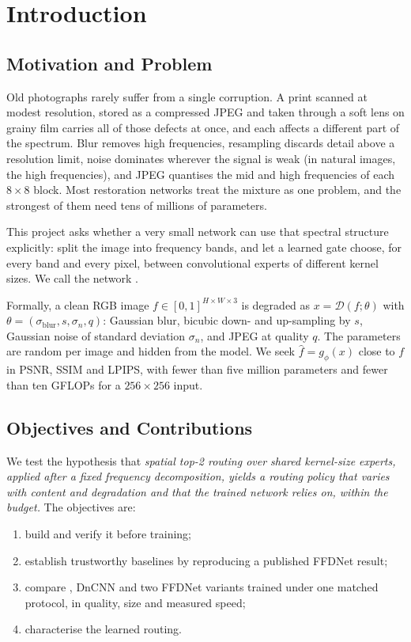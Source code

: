 \chapter{Introduction}\label{ch:intro}

\section{Motivation and Problem}\label{sec:motivation}

Old photographs rarely suffer from a single corruption. A print scanned at
modest resolution, stored as a compressed JPEG and taken through a soft lens
on grainy film carries all of those defects at once, and each affects a
different part of the spectrum. Blur removes high frequencies, resampling
discards detail above a resolution limit, noise dominates wherever the signal
is weak (in natural images, the high frequencies), and JPEG quantises the mid
and high frequencies of each $8\times8$ block. Most restoration networks
treat the mixture as one problem, and the strongest of them
need tens of millions of parameters.

This project asks whether a very small network can use that spectral
structure explicitly: split the image into frequency bands, and let a learned
gate choose, for every band and every pixel, between convolutional experts of
different kernel sizes. We call the network \fcsg{}.

Formally, a clean RGB image $f\in[0,1]^{H\times W\times 3}$ is degraded as
$x=\mathcal{D}(f;\theta)$ with $\theta=(\sigma_\text{blur}, s, \sigma_n, q)$:
Gaussian blur, bicubic down- and up-sampling by $s$, Gaussian noise of
standard deviation $\sigma_n$, and JPEG at quality $q$. The parameters are
random per image and hidden from the model. We seek $\hat f=g_\phi(x)$ close
to $f$ in PSNR, SSIM and LPIPS, with fewer than five million parameters and
fewer than ten GFLOPs for a $256\times256$ input.

\section{Objectives and Contributions}\label{sec:objectives}

We test the hypothesis that \emph{spatial top-2 routing over shared
kernel-size experts, applied after a fixed frequency decomposition, yields a
routing policy that varies with content and degradation and that the trained
network relies on, within the budget.} The objectives are:
\begin{enumerate}
	\item[\textbf{O1}] build \fcsg{} and verify it before training;
	\item[\textbf{O2}] establish trustworthy baselines by reproducing a
	published FFDNet result;
	\item[\textbf{O3}] compare \fcsg{}, DnCNN and two FFDNet variants trained
	under one matched protocol, in quality, size and measured speed;
	\item[\textbf{O4}] characterise the learned routing.
\end{enumerate}

